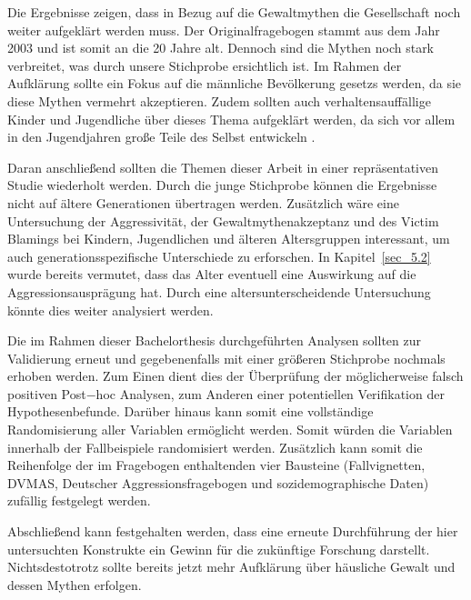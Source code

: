 Die Ergebnisse zeigen, dass in Bezug auf die Gewaltmythen die Gesellschaft noch weiter aufgeklärt werden muss. Der Originalfragebogen stammt aus dem Jahr 2003 und ist somit an die 20 Jahre alt. Dennoch sind die Mythen noch stark verbreitet, was durch unsere Stichprobe ersichtlich ist. Im Rahmen der Aufklärung sollte ein Fokus auf die männliche Bevölkerung gesetzs werden, da sie diese Mythen vermehrt akzeptieren. Zudem sollten auch verhaltensauffällige Kinder und Jugendliche über dieses Thema aufgeklärt werden, da sich vor allem in den Jugendjahren große Teile des Selbst entwickeln \parencite{H1_Entwicklung}.

Daran anschließend sollten die Themen dieser Arbeit in einer repräsentativen Studie wiederholt werden. Durch die junge Stichprobe können die Ergebnisse nicht auf ältere Generationen übertragen werden. Zusätzlich wäre eine Untersuchung der Aggressivität, der Gewaltmythenakzeptanz und des Victim Blamings bei Kindern, Jugendlichen und älteren Altersgruppen interessant, um auch generationsspezifische Unterschiede zu erforschen. In Kapitel~\ref{sec_5.2} wurde bereits vermutet, dass das Alter eventuell eine Auswirkung auf die Aggressionsausprägung hat. Durch eine altersunterscheidende Untersuchung könnte dies weiter analysiert werden. 

Die im Rahmen dieser Bachelorthesis durchgeführten Analysen sollten zur Validierung erneut und gegebenenfalls mit einer größeren Stichprobe nochmals erhoben werden. Zum Einen dient dies der Überprüfung der möglicherweise falsch positiven Post$-$hoc Analysen, zum Anderen einer potentiellen Verifikation der Hypothesenbefunde. Darüber hinaus kann somit eine vollständige Randomisierung aller Variablen ermöglicht werden. Somit würden die Variablen innerhalb der Fallbeispiele randomisiert werden. Zusätzlich kann somit die Reihenfolge der im Fragebogen enthaltenden vier Bausteine (Fallvignetten, DVMAS, Deutscher Aggressionsfragebogen und sozidemographische Daten) zufällig festgelegt werden. 


Abschließend kann festgehalten werden, dass eine erneute Durchführung der hier untersuchten Konstrukte ein Gewinn für die zukünftige Forschung darstellt. Nichtsdestotrotz sollte bereits jetzt mehr Aufklärung über häusliche Gewalt und dessen Mythen erfolgen.
